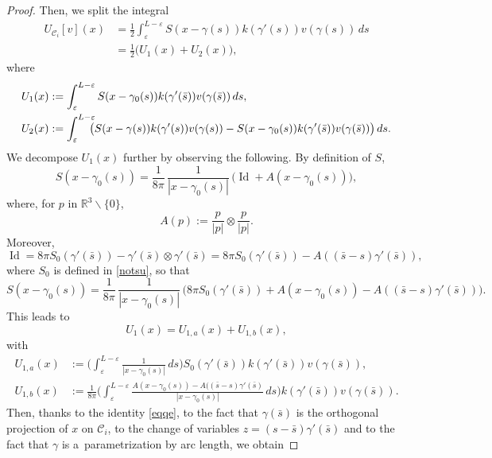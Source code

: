 \documentclass[JEP,XML,SOM,Unicode, NoEqCountersInSection,NoFloatCountersInSection,published]{cedram}
\newcommand{\R}{\mathbb{R}}
\let\eps\varepsilon
\newcommand{\dd}{\,d}
\DeclareMathOperator{\Id}{Id}
\theoremstyle{definition}
\theoremstyle{remark}
\begin{document}
\begin{proof}
Then, we split the integral
\begin{align}
\nonumber U_{\mathcal C_i}[v](x) &= \frac12 \int_\eps^{L-\eps} S(x - \gamma(s)) k(\gamma'(s)) v(\gamma (s)) \dd s
\label{indec}
\\ &= \frac12 \big(U_1 (x) + U_2 (x)\big),
\end{align}
where
\begin{align}
U_1 (x) &:= \int_\eps^{L-\eps} S(x - \gamma_0(s)) k(\gamma'(\bar s)) v(\gamma (\bar s)) \dd s, \\
U_2 (x)&:= \int_\eps^{L-\eps} \hspace*{-2mm}\bigl(S(x - \gamma(s)) k(\gamma'(s)) v(\gamma (s)) - S(x - \gamma_0(s)) k(\gamma'(\bar s)) v(\gamma (\bar s))\bigr) \dd s.
\end{align}
We decompose $U_1 (x)$ further by observing the following. By definition of $S$,
\begin{equation}
S(x - \gamma_0(s)) =
{\frac1{8\pi}}\,\frac 1 {|x - \gamma_0(s)|}\, \bigl(
\Id +A(x - \gamma_0(s))\bigr),
\end{equation}
where, for $p$ in $\R^3 \smallsetminus \{0\}$,
\[
A(p) := \frac p {|p|} \otimes \frac p {|p|}.\]
Moreover,
\begin{equation}
\Id = {8\pi} S_0 (\gamma'(\bar s)) - \gamma'(\bar s) \otimes \gamma'(\bar s) = {8\pi}S_0 (\gamma'(\bar s)) - A((\bar s - s) \gamma'(\bar s)),
\end{equation}
where $S_0$ is defined in \eqref{notsu},
so that
\begin{equation}
S(x - \gamma_0(s)) = \frac1{8\pi}\,\frac 1 {|x - \gamma_0(s)|}\, \bigl(
{8\pi}S_0 (\gamma'(\bar s)) +A(x - \gamma_0(s)) - A((\bar s - s) \gamma'(\bar s))\bigr).
\end{equation}
This leads to
\begin{equation}
\label{redec}
U_1 (x) = U_{1,a} (x) + U_{1,b} (x),
\end{equation}
with
\begin{align*}
U_{1,a} (x) &:= \biggl(\int_\eps^{L-\eps} \frac 1 {|x - \gamma_0(s)|} \dd s \biggr) S_0 (\gamma'(\bar s)) k(\gamma'(\bar s)) v(\gamma (\bar s)),\\
U_{1,b} (x) &:=
{\frac1{8\pi}}\biggl(\int_\eps^{L-\eps} \frac {A(x - \gamma_0(s)) - A((\bar s - s) \gamma'(\bar s)} {|x - \gamma_0(s)|}
\dd s \biggr) k(\gamma'(\bar s)) v(\gamma (\bar s)).
\end{align*}
Then, thanks to the identity \eqref{eqqe}, to the fact that $\gamma (\bar s)$ is
the orthogonal projection of $x$ on
$\mathcal C_i$, to the change of variables $z=(s-\bar s)\gamma'(\bar s)$ and to the fact that $\gamma$ is a~parametrization by arc length, we obtain

\end{proof}
\end{document}
